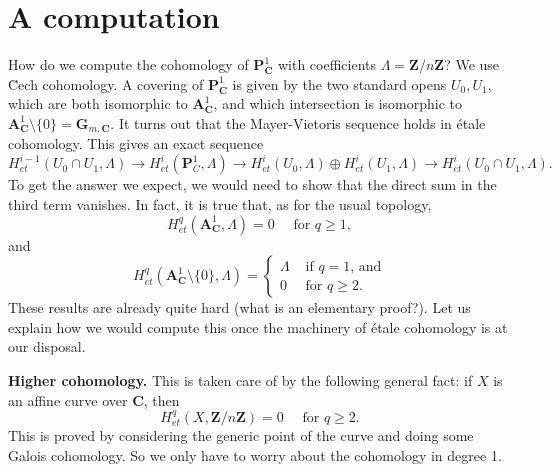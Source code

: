 \section{A computation}
\label{section-computation}

\noindent
How do we compute the cohomology of $\mathbf{P}^1_\mathbf{C}$ with coefficients
$\Lambda = \mathbf{Z}/n\mathbf{Z}$?
We use \u Cech cohomology. A covering of $\mathbf{P}^1_\mathbf{C}$ is given by
the two standard opens $U_0, U_1$, which are both
isomorphic to $\mathbf{A}^1_\mathbf{C}$, and which intersection is isomorphic
to $\mathbf{A}^1_\mathbf{C} \setminus \{0\} = \mathbf{G}_{m, \mathbf{C}}$.
It turns out that the Mayer-Vietoris sequence holds in \'etale cohomology.
This gives an exact sequence
$$
H_{et}^{i-1}(U_0\cap U_1, \Lambda) \to
H_{et}^i(\mathbf{P}^1_C, \Lambda) \to H_{et}^i(U_0, \Lambda) \oplus
H_{et}^i(U_1, \Lambda) \to H_{et}^i(U_0\cap U_1,
\Lambda).
$$
To get the answer we expect, we would need to show that the direct sum in the
third term vanishes. In fact, it is true that, as for the usual topology,
$$
H_{et}^q (\mathbf{A}^1_\mathbf{C}, \Lambda) = 0 \quad \text{ for } q \geq 1,
$$
and
$$
H_{et}^q (\mathbf{A}^1_\mathbf{C} \setminus \{0\}, \Lambda) = \left\{
\begin{matrix}
\Lambda & \text{ if $q = 1$, and} \\
0 & \text{ for $q \geq 2$.}
\end{matrix}
\right.
$$
These results are already quite hard (what is an elementary proof?). Let us
explain how we would compute this once the machinery of \'etale cohomology is
at our disposal.

\medskip\noindent
{\bf Higher cohomology.} This is taken care of by the following general
fact: if $X$ is an affine curve over $\mathbf{C}$, then
$$
H_{et}^q (X, \mathbf{Z}/n\mathbf{Z}) = 0 \quad \text{ for } q \geq 2.
$$
This is proved by considering the generic point of the curve and doing some
Galois cohomology. So we only have to worry about the cohomology in degree 1.

